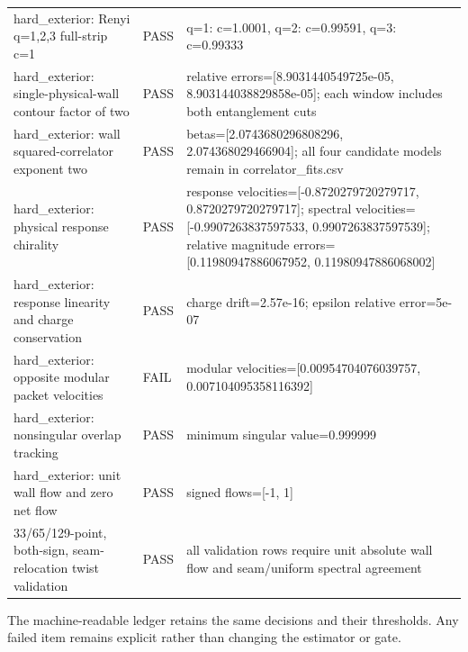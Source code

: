 \documentclass[aps,prb,onecolumn,nofootinbib,superscriptaddress]{revtex4-2}
\begin{document}
\begin{longtable}{p{}p{}p{}}
hard\_exterior: Renyi q=1,2,3 full-strip c=1 & PASS & q=1: c=1.0001, q=2: c=0.99591, q=3: c=0.99333 \\
hard\_exterior: single-physical-wall contour factor of two & PASS & relative errors=[8.9031440549725e-05, 8.903144038829858e-05]; each window includes both entanglement cuts \\
hard\_exterior: wall squared-correlator exponent two & PASS & betas=[2.0743680296808296, 2.074368029466904]; all four candidate models remain in correlator\_fits.csv \\
hard\_exterior: physical response chirality & PASS & response velocities=[-0.8720279720279717, 0.8720279720279717]; spectral velocities=[-0.9907263837597533, 0.9907263837597539]; relative magnitude errors=[0.11980947886067952, 0.11980947886068002] \\
hard\_exterior: response linearity and charge conservation & PASS & charge drift=2.57e-16; epsilon relative error=5e-07 \\
hard\_exterior: opposite modular packet velocities & FAIL & modular velocities=[0.00954704076039757, 0.007104095358116392] \\
hard\_exterior: nonsingular overlap tracking & PASS & minimum singular value=0.999999 \\
hard\_exterior: unit wall flow and zero net flow & PASS & signed flows=[-1, 1] \\
33/65/129-point, both-sign, seam-relocation twist validation & PASS & all validation rows require unit absolute wall flow and seam/uniform spectral agreement \\
\bottomrule
\end{longtable}
The machine-readable ledger retains the same decisions and their thresholds.  Any failed
item remains explicit rather than changing the estimator or gate.
\end{document}
